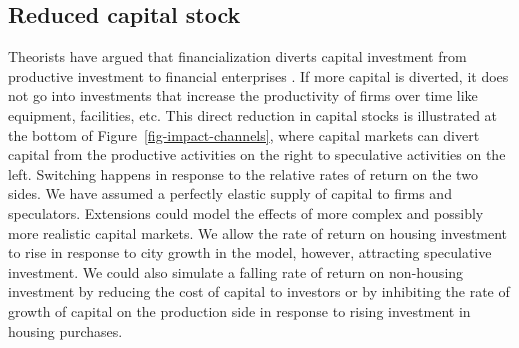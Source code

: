 




\subsection{Reduced capital stock}
Theorists have argued that financialization diverts capital investment from productive investment to financial enterprises \cite{lefebvreRevolutionUrbaine1970, harveyClassmonopolyRentFinance1974, harveyUrbanProcessCapitalism1978, christophersRevisitingUrbanizationCapital2011}. %
If more capital is diverted, it does not go into investments that increase the productivity of firms over time like equipment, facilities, etc. This direct reduction in \glspl{capital stock} %
is illustrated at the bottom of Figure~\ref{fig-impact-channels}, where \glspl{capital market} can divert capital from the productive activities on the right to speculative activities on the left. Switching happens in response to the relative rates of return on the two sides. We have assumed a perfectly elastic supply of capital to firms and speculators. Extensions could model the effects of more complex and possibly more realistic capital markets. We allow the rate of return on housing investment to rise in response to city growth in the model, however, attracting speculative investment. We could also simulate a falling rate of return on non-housing investment by reducing the cost of capital to investors or by inhibiting the rate of growth of capital on the production side in response to rising investment in housing purchases. 


